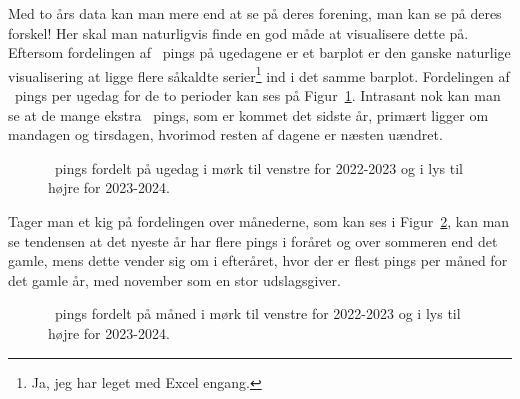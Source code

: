\begin{article}
Med to års data kan man mere end at se på deres forening, man kan se på deres forskel!
Her skal man naturligvis finde en god måde at visualisere dette på. Eftersom fordelingen af \coffee\ pings på ugedagene er et barplot er den ganske naturlige visualisering at ligge flere såkaldte serier\footnote{Ja, jeg har leget med Excel engang.} ind i det samme barplot. Fordelingen af \coffee\ pings per ugedag for de to perioder kan ses på Figur~\ref{fig:weekday_analysis_side_by_side_2022-2023_2023-2024}. Intrasant nok kan man se at de mange ekstra \coffee\ pings, som er kommet det sidste år, primært ligger om mandagen og tirsdagen, hvorimod resten af dagene er næsten uændret.

\begin{figure}[H]
	\centering
	\resizebox{\columnwidth}{!}{}
	\vspace{-20pt}
	\caption{\protect\coffee\ pings fordelt på ugedag i mørk til venstre for 2022-2023 og i lys til højre for 2023-2024.}
	\label{fig:weekday_analysis_side_by_side_2022-2023_2023-2024}
\end{figure}

Tager man et kig på fordelingen over månederne, som kan ses i Figur~\ref{fig:month_analysis_side_by_side_2022-2023_2023-2024}, kan man se tendensen at det nyeste år har flere pings i foråret og over sommeren end det gamle, mens dette vender sig om i efteråret, hvor der er flest pings per måned for det gamle år, med november som en stor udslagsgiver.

\begin{figure}[H]
	\centering
	\resizebox{\columnwidth}{!}{}
	\vspace{-20pt}
	\caption{\protect\coffee\ pings fordelt på måned i mørk til venstre for 2022-2023 og i lys til højre for 2023-2024.}
	\label{fig:month_analysis_side_by_side_2022-2023_2023-2024}
\end{figure}


\end{article}
